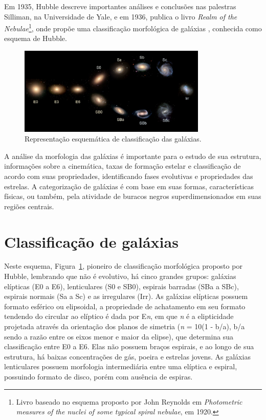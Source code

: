 Em 1935, Hubble descreve importantes análises e conclusões nas palestras Silliman, na Universidade de Yale, e em 1936, publica o livro \emph{Realm of the Nebulae}\footnote{Livro baseado no esquema proposto por John Reynolds em \emph{Photometric measures of the nuclei of some typical spiral nebulae}, em 1920.}, onde propõe uma classificação morfológica de galáxias \cite{hubble1936}, conhecida como esquema de Hubble.

\begin{figure}[h] 
  \centering 
  \includegraphics[width=0.8\textwidth]{Imagens/HubbleTuningFork.jpg} 
  \caption[Esquema de Hubble de classificação de galáxias.]{Representação esquemática de classificação das galáxias\footnotemark.} 
  \label{fig:esquema_hubble} 
\end{figure}

A análise da morfologia das galáxias é importante para o estudo de sua estrutura, informações sobre a cinemática, taxas de formação estelar e classificação de acordo com suas propriedades, identificando fases evolutivas e propriedades das estrelas. A categorização de galáxias é com base em suas formas, características físicas, ou também, pela atividade de buracos negros superdimensionados em suas regiões centrais.

\section{Classificação de galáxias}

Neste esquema, Figura~\ref{fig:esquema_hubble}, pioneiro de classificação morfológica proposto por Hubble, lembrando que não é evolutivo, há cinco grandes grupos: galáxias elípticas (E0 a E6), lenticulares (S0 e SB0), espirais barradas (SBa a SBc), espirais normais (Sa a Sc) e as irregulares (Irr). As galáxias elípticas possuem formato esférico ou elipsoidal, a propriedade de achatamento em seu formato tendendo do circular ao elíptico é dada por E\emph{n}, em que \emph{n} é a elipticidade projetada através da orientação dos planos de simetria (\emph{n} = 10(1 - b/a), b/a sendo a razão entre os eixos menor e maior da elipse), que determina sua classificação entre E0 a E6. Elas não possuem braços espirais, e ao longo de sua estrutura, há baixas concentrações de gás, poeira e estrelas jovens. As galáxias lenticulares possuem morfologia intermediária entre uma elíptica e espiral, possuindo formato de disco, porém com ausência de espiras.

